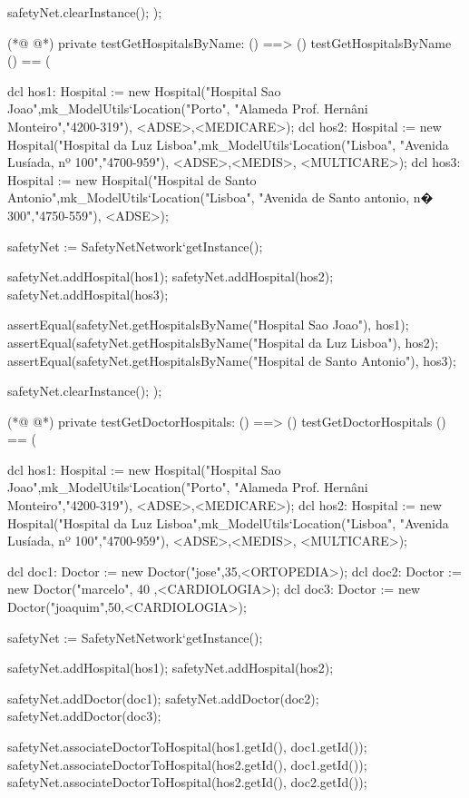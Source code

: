\begin{vdmpp}[breaklines=true]
  safetyNet.clearInstance();
);

(*@
\label{testGetHospitalsByName:393}
@*)
private testGetHospitalsByName: () ==> ()
 testGetHospitalsByName () == (
  
  dcl hos1: Hospital := new Hospital("Hospital Sao Joao",mk_ModelUtils`Location("Porto", "Alameda Prof. Hernâni Monteiro","4200-319"), {<ADSE>,<MEDICARE>});
  dcl hos2: Hospital := new Hospital("Hospital da Luz Lisboa",mk_ModelUtils`Location("Lisboa", "Avenida Lusíada, nº 100","4700-959"), {<ADSE>,<MEDIS>, <MULTICARE>});
  dcl hos3: Hospital := new Hospital("Hospital de Santo Antonio",mk_ModelUtils`Location("Lisboa", "Avenida de Santo antonio, n� 300","4750-559"), {<ADSE>});
  
  safetyNet := SafetyNetNetwork`getInstance();
   
  safetyNet.addHospital(hos1);
  safetyNet.addHospital(hos2);
  safetyNet.addHospital(hos3);
 
  assertEqual(safetyNet.getHospitalsByName("Hospital Sao Joao"), {hos1});
  assertEqual(safetyNet.getHospitalsByName("Hospital da Luz Lisboa"), {hos2});
  assertEqual(safetyNet.getHospitalsByName("Hospital de Santo Antonio"), {hos3});
  
  safetyNet.clearInstance();
);

(*@
\label{testGetDoctorHospitals:413}
@*)
private testGetDoctorHospitals: () ==> ()
 testGetDoctorHospitals () == (
 
  dcl hos1: Hospital := new Hospital("Hospital Sao Joao",mk_ModelUtils`Location("Porto", "Alameda Prof. Hernâni Monteiro","4200-319"), {<ADSE>,<MEDICARE>});
  dcl hos2: Hospital := new Hospital("Hospital da Luz Lisboa",mk_ModelUtils`Location("Lisboa", "Avenida Lusíada, nº 100","4700-959"), {<ADSE>,<MEDIS>, <MULTICARE>});
  
  dcl doc1: Doctor := new Doctor("jose",35,<ORTOPEDIA>);
  dcl doc2: Doctor := new Doctor("marcelo", 40 ,<CARDIOLOGIA>);
  dcl doc3: Doctor := new Doctor("joaquim",50,<CARDIOLOGIA>);
  
  safetyNet := SafetyNetNetwork`getInstance();
   
  safetyNet.addHospital(hos1);
  safetyNet.addHospital(hos2);
  
  safetyNet.addDoctor(doc1);
  safetyNet.addDoctor(doc2);
  safetyNet.addDoctor(doc3);

  safetyNet.associateDoctorToHospital(hos1.getId(), doc1.getId());
  safetyNet.associateDoctorToHospital(hos2.getId(), doc1.getId());
  safetyNet.associateDoctorToHospital(hos2.getId(), doc2.getId());


\end{vdmpp}
